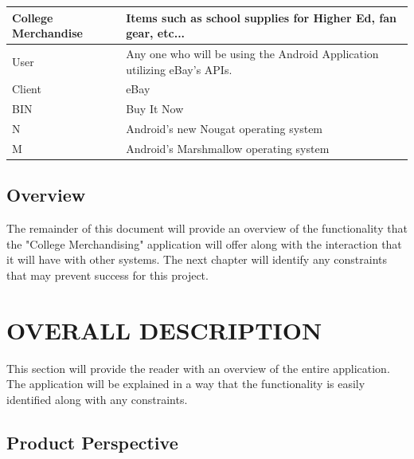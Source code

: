 \documentclass[journal,compsoc, 10pt, draftclsnofoot, onecolumn]{IEEEtran}
\begin{document}
\begin{table}[]
\begin{tabularx}{\textwidth}{X|X}
College Merchandise     & Items such as school supplies for Higher Ed, fan gear, etc...                                                                 \\ \hline
User                   	      & Any one who will be using the Android Application utilizing eBay's APIs.                                                      \\ \hline
Client                 	      & eBay                                                                                                                          \\ \hline
BIN                    	      & Buy It Now                                                                                                                    \\ \hline
N                   	      & Android's new Nougat operating system 
\\ \hline
M                   	      & Android's Marshmallow operating system                                                                                                                   \\ \hline
\end{tabularx}
\end{table}

\newpage

\subsection{Overview}

The remainder of this document will provide an overview of the functionality 
that the "College Merchandising" application will offer along with the 
interaction that it will have with other systems. The next chapter will identify
 any constraints that may prevent success for this project.

\section{OVERALL DESCRIPTION}

This section will provide the reader with an overview of the entire application.
 The application will be explained in a way that the functionality is easily 
identified along with any constraints.

\subsection{Product Perspective}
\end{document}

